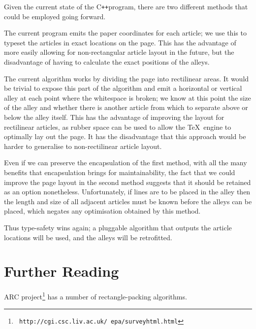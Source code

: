 \documentclass[a4paper]{scrartcl}
\newcommand{\cpp}{\mbox{C\texttt{++}}}
\begin{document}
Given the current state of the \cpp program, there are two different
methods that could be employed going forward.

The current program emits the paper coordinates for each article; we
use this to typeset the articles in exact locations on the page. This
has the advantage of more easily allowing for non-rectangular article
layout in the future, but the disadvantage of having to calculate the
exact positions of the alleys.

The current algorithm works by dividing the page into rectilinear
areas. It would be trivial to expose this part of the algorithm and
emit a horizontal or vertical alley at each point where the
whitespace is broken; we know at this point the size of the alley and
whether there is another article from which to separate above or below
the alley itself. This has the advantage of improving the layout for
rectilinear articles, as rubber space can be used to allow the
\TeX\ engine to optimally lay out the page. It has the disadvantage
that this approach would be harder to generalise to non-rectilinear
article layout.

Even if we can preserve the encapsulation of the first method, with
all the many benefits that encapsulation brings for maintainability,
the fact that we could improve the page layout in the second method
suggests that it should be retained as an option
nonetheless. Unfortunately, if lines are to be placed in the alley
then the length and size of all adjacent articles must be known before
the alleys can be placed, which negates any optimisation obtained by
this method.

Thus type-safety wins again; a pluggable algorithm that outputs the
article locations will be used, and the alleys will be retrofitted.

\section*{Further Reading}

ARC project\footnote{\texttt{\tiny
    http://cgi.csc.liv.ac.uk/~epa/surveyhtml.html}} has a number of
rectangle-packing algorithms.
\end{document}
